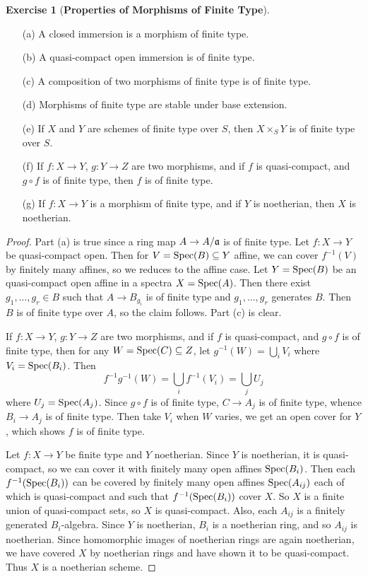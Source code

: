 \documentclass[11pt]{book}
\theoremstyle{definition}
\newtheorem{exercise}{Exercise}[section]
\begin{document}
\begin{exercise}[\textbf{Properties of Morphisms of Finite Type}]
\mbox{}
\begin{itemize}
\item[(a)] A closed immersion is a morphism of finite type.
\item[(b)] A quasi-compact open immersion is of finite type.
\item[(c)] A composition of two morphisms of finite type is of finite type.
\item[(d)] Morphisms of finite type are stable under base extension.
\item[(e)] If $X$ and $Y$ are schemes of finite type over $S$, then $X\times_SY$ is of finite type over $S$.
\item[(f)] If $f:X\to Y$, $g:Y\to Z$ are two morphisms, and if $f$ is quasi-compact, and $g\circ f$ is of finite type, then $f$ is of finite type.
\item[(g)] If $f:X\to Y$ is a morphism of finite type, and if $Y$ is noetherian, then $X$ is noetherian.
\end{itemize}
\end{exercise}
\begin{proof}
Part (a) is true since a ring map $A\to A/\mathfrak{a}$ is of finite type. Let $f:X\to Y$ be quasi-compact open. Then for $V=\mathrm{Spec}(B)\subseteq Y$ affine, we can cover $f^{-1}(V)$ by finitely many affines, so we reduces to the affine case. Let $Y=\mathrm{Spec}(B)$ be an quasi-compact open affine in a spectra $X=\mathrm{Spec}(A)$. Then there exist $g_1,\dots,g_r\in B$ such that $A\to B_{g_i}$ is of finite type and $g_1,\dots,g_r$ generates $B$. Then $B$ is of finite type over $A$, so the claim follows. Part (c) is clear.\par
If $f:X\to Y$, $g:Y\to Z$ are two morphisms, and if $f$ is quasi-compact, and $g\circ f$ is of finite type, then for any $W=\mathrm{Spec}(C)\subseteq Z$, let $g^{-1}(W)=\bigcup_iV_i$ where $V_i=\mathrm{Spec}(B_i)$. Then
\[f^{-1}g^{-1}(W)=\bigcup_if^{-1}(V_i)=\bigcup_jU_j\]
where $U_j=\mathrm{Spec}(A_j)$. Since $g\circ f$ is of finite type, $C\to A_j$ is of finite type, whence $B_i\to A_j$ is of finite type. Then take $V_i$ when $W$ varies, we get an open cover for $Y$, which shows $f$ is of finite type.\par
Let $f:X\to Y$ be finite type and $Y$ noetherian. Since $Y$ is noetherian, it is quasi-compact, so we can cover it with finitely many open affines $\mathrm{Spec}(B_i)$. Then each $f^{-1}(\mathrm{Spec}(B_i))$ can be covered by finitely many open affines $\mathrm{Spec}(A_{ij})$ each of which is quasi-compact and such that $f^{-1}(\mathrm{Spec}(B_i))$ cover $X$. So $X$ is a finite union of quasi-compact sets, so $X$ is quasi-compact. Also, each $A_{ij}$ is a finitely generated $B_i$-algebra. Since $Y$ is noetherian, $B_i$ is a noetherian ring, and so $A_{ij}$ is noetherian. Since homomorphic images of noetherian rings are again noetherian, we have covered $X$ by noetherian rings and have shown it to be quasi-compact. Thus $X$ is a noetherian scheme.
\end{proof}
\end{document}

